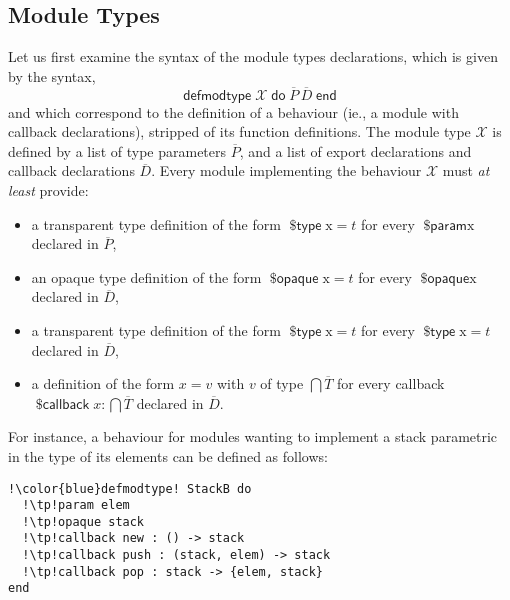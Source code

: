 \documentclass[a4paper,10pt]{article}
\DeclareMathOperator{\kwdefmt}{\textsf{defmodtype}}
\DeclareMathOperator{\kwend}{\textsf{end}}
\DeclareMathOperator{\kwdo}{\textsf{do}}
\DeclareMathOperator{\kwprm}{\textsf{\$param}}
\DeclareMathOperator{\kwopq}{\textsf{\$opaque}}
\DeclareMathOperator{\kwtp}{\textsf{\$type}}
\DeclareMathOperator{\kwclbk}{\textsf{\$callback}}
\newcommand{\tx}{\textrm{x}}
\begin{document}
\subsection{Module Types}
Let us first examine the syntax of the module types declarations, which is given by the syntax, \[\kwdefmt \mathcal X \kwdo \overline{P}\, \overline{D} \kwend\] and which correspond to the definition of a behaviour (ie., a module with callback declarations), stripped of its function definitions. The module type $\mathcal X$ is defined by a list of type parameters $\overline{P}$, and a list of export declarations and callback declarations $\overline{D}$. Every module implementing the behaviour $\mathcal X$ must \emph{at least} provide:
\begin{itemize}
    \item a transparent type definition of the form $\kwtp \tx = t$ for every $\kwprm \tx$ declared in $\overline{P}$,
    \item an opaque type definition of the form $\kwopq \tx = t$ for every $\kwopq \tx$ declared in $\overline{D}$,
    \item a transparent type definition of the form $\kwtp \tx = t$ for every $\kwtp \tx = t$ declared in $\overline{D}$,
    \item a definition of the form $x = v$  with $v$ of type $\bigcap\overline{T}$ for every callback $\kwclbk x : \bigcap \overline{T}$ declared in $\overline{D}$.
\end{itemize} 
For instance, a  behaviour for modules wanting to implement a stack parametric in the type of its elements can be defined as follows:
\begin{verbatim}
!\color{blue}defmodtype! StackB do
  !\tp!param elem
  !\tp!opaque stack
  !\tp!callback new : () -> stack
  !\tp!callback push : (stack, elem) -> stack
  !\tp!callback pop : stack -> {elem, stack}
end
\end{verbatim}
\end{document}
